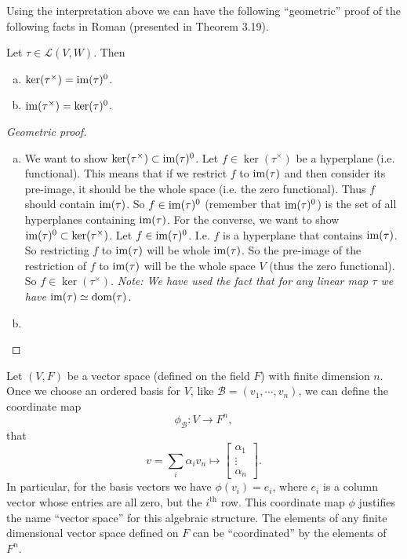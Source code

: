 \begin{observation}
	Using the interpretation above we can have the following ``geometric'' proof of the following facts in Roman (presented in Theorem 3.19).
	\begin{proposition}
		Let $ \tau \in \mathcal{L}(V,W) $. Then
		\begin{enumerate}[(a)]
			\item $ \ker(\tau^\times) = \operatorname{im}(\tau)^0 $.
			\item $ \operatorname{im}(\tau^\times) = \ker(\tau)^0 $.
		\end{enumerate}
		\begin{proof}[Geometric proof]
			\begin{enumerate}[(a)]
				\item We want to show $ \ker(\tau^\times ) \subset \operatorname{im}(\tau)^0 $. Let $ f\in \ker(\tau^\times) $ be a hyperplane (i.e. functional). This means that if we restrict $ f $ to $ \operatorname{im}(\tau) $ and then consider its pre-image, it should be the whole space (i.e. the zero functional). Thus $ f $ should contain $ \operatorname{im}(\tau) $. So $ f\in \operatorname{im}(\tau)^0 $ (remember that $ \operatorname{im}(\tau)^0 $) is the set of all hyperplanes containing $ \operatorname{im}(\tau) $. For the converse, we want to show $ \operatorname{im}(\tau)^0 \subset \ker(\tau^\times) $. Let $ f \in \operatorname{im}(\tau)^0 $. I.e. $ f $ is a hyperplane that contains $ \operatorname{im}(\tau) $. So restricting $ f $ to $ \operatorname{im}(\tau) $ will be whole $ \operatorname{im}(\tau) $. So the pre-image of the restriction of $ f $ to $ \operatorname{im}(\tau) $ will be the whole space $ V $ (thus the zero functional). So $ f\in \ker(\tau^\times) $. \emph{Note: We have used the fact that for any linear map $ \tau $ we have $ \operatorname{im}(\tau) \simeq \operatorname{dom}(\tau) $}.
				
				\item 
				
			\end{enumerate}
		\end{proof}
	\end{proposition}
\end{observation}



\begin{observation}
	Let $ (V,F) $ be a vector space (defined on the field $ F $) with finite dimension $ n $. Once we choose an ordered basis for $ V $, like $ \mathcal{B} = (v_1,\cdots,v_n) $, we can define the coordinate map
	\[ \phi_\mathcal{B}: V \to F^n, \]
	that
	\[ v = \sum_i \alpha_i v_n \mapsto \begin{bmatrix}
		\alpha_1 \\
		\vdots \\
		\alpha_n
	\end{bmatrix}. \]
	In particular, for the basis vectors we have $ \phi(v_i) = e_i $, where $ e_i $ is a column vector whose entries are all zero, but the $ i^\text{th} $ row. This coordinate map $ \phi $ justifies the name ``vector space'' for this algebraic structure. The elements of any finite dimensional vector space defined on $ F $ can be ``coordinated'' by the elements of $ F^n $.
\end{observation}

